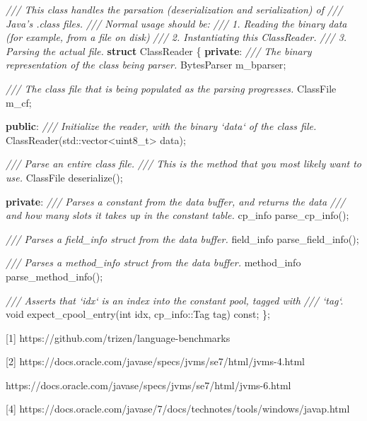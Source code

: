 \documentclass[]{article}
\newenvironment{Shaded}{}{}
\newcommand{\KeywordTok}[1]{\textcolor[rgb]{0.00,0.44,0.13}{\textbf{#1}}}
\newcommand{\DataTypeTok}[1]{\textcolor[rgb]{0.56,0.13,0.00}{#1}}
\newcommand{\CommentTok}[1]{\textcolor[rgb]{0.38,0.63,0.69}{\textit{#1}}}
\newcommand{\VariableTok}[1]{\textcolor[rgb]{0.10,0.09,0.49}{#1}}
\newcommand{\BuiltInTok}[1]{#1}
\newcommand{\AttributeTok}[1]{\textcolor[rgb]{0.49,0.56,0.16}{#1}}
\newcommand{\NormalTok}[1]{#1}
\begin{document}
\begin{Shaded}
	\begin{Highlighting}[]
		\CommentTok{/// This class handles the parsation (deserialization and serialization) of}
		\CommentTok{/// Java's .class files.}
		\CommentTok{/// Normal usage should be:}
		\CommentTok{/// 1. Reading the binary data (for example, from a file on disk)}
		\CommentTok{/// 2. Instantiating this ClassReader.}
		\CommentTok{/// 3. Parsing the actual file.}
		\KeywordTok{struct}\NormalTok{ ClassReader \{}
		\KeywordTok{private}\NormalTok{:}
		\CommentTok{/// The binary representation of the class being parser.}
		\NormalTok{    BytesParser }\VariableTok{m_bparser}\NormalTok{;}

		\CommentTok{/// The class file that is being populated as the parsing progresses.}
		\NormalTok{    ClassFile }\VariableTok{m_cf}\NormalTok{;}

		\KeywordTok{public}\NormalTok{:}
		\CommentTok{/// Initialize the reader, with the binary `data` of the class file.}
		\NormalTok{    ClassReader(}\BuiltInTok{std::}\NormalTok{vector<}\DataTypeTok{uint8_t}\NormalTok{> data);}

		\CommentTok{/// Parse an entire class file.}
		\CommentTok{/// This is the method that you most likely want to use.}
		\NormalTok{    ClassFile deserialize();}

		\KeywordTok{private}\NormalTok{:}
		\CommentTok{/// Parses a constant from the data buffer, and returns the data}
		\CommentTok{/// and how many slots it takes up in the constant table.}
		\NormalTok{    cp_info parse_cp_info();}

		\CommentTok{/// Parses a field_info struct from the data buffer.}
		\NormalTok{    field_info parse_field_info();}

		\CommentTok{/// Parses a method_info struct from the data buffer.}
		\NormalTok{    method_info parse_method_info();}

		\CommentTok{/// Asserts that `idx` is an index into the constant pool, tagged with}
		\CommentTok{/// `tag`.}
		\DataTypeTok{void}\NormalTok{ expect_cpool_entry(}\DataTypeTok{int}\NormalTok{ idx, cp_info::Tag tag) }\AttributeTok{const}\NormalTok{;}
		\NormalTok{\};}
	\end{Highlighting}
\end{Shaded}

{[}1{]} https://github.com/trizen/language-benchmarks

{[}2{]} https://docs.oracle.com/javase/specs/jvms/se7/html/jvms-4.html

https://docs.oracle.com/javase/specs/jvms/se7/html/jvms-6.html

{[}4{]}
https://docs.oracle.com/javase/7/docs/technotes/tools/windows/javap.html
\end{document}

